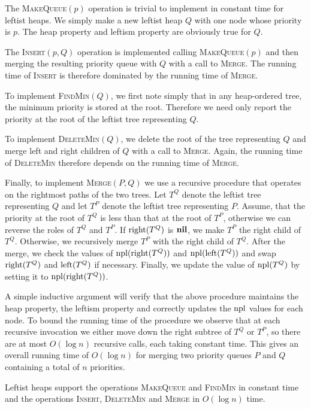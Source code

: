 The \textsc{MakeQueue}$(p)$ operation is trivial to implement in
constant time for leftist heaps.  We simply make a new leftist heap
$Q$ with one node whose priority is $p$.  The heap property and
leftism property are obviously true for $Q$.

The \textsc{Insert}$(p,Q)$ operation is implemented calling
\textsc{MakeQueue$(p)$} and then merging the resulting priority queue
with $Q$ with a call to \textsc{Merge}.  The running time of
\textsc{Insert} is therefore dominated by the running time of
\textsc{Merge}.

To implement \textsc{FindMin}$(Q)$, we first note simply that in
any heap-ordered tree, the minimum priority is stored at the
root. Therefore we need only report the priority at the root of the
leftist tree representing $Q$.

To implement \textsc{DeleteMin$(Q)$}, we delete the root of the tree
representing $Q$ and merge left and right children of $Q$ with a call
to \textsc{Merge}. Again, the running time of \textsc{DeleteMin}
therefore depends on the running time of \textsc{Merge}.

Finally, to implement \textsc{Merge$(P,Q)$} we use a recursive
procedure that operates on the rightmost paths of the two trees.  Let
$T^Q$ denote the leftist tree representing $Q$ and let $T^P$ denote
the leftist tree representing $P$.  Assume, that the priority at the
root of $T^Q$ is less than that at the root of $T^P$, otherwise we can
reverse the roles of $T^Q$ and $T^P$.  If $\mathrm{right}(T^Q)$ is $\mathbf{nil}$, we
make $T^P$ the right child of $T^Q$.  Otherwise, we recursively merge
$T^P$ with the right child of $T^Q$.  After the merge, we check the
values of $\mathrm{npl}(\mathrm{right}(T^Q))$ and $\mathrm{npl}(\mathrm{left}(T^Q))$ and swap
$\mathrm{right}(T^Q)$ and $\mathrm{left}(T^Q)$ if necessary.  Finally, we update the
value of $\mathrm{npl}(T^Q)$ by setting it to $\mathrm{npl}(\mathrm{right}(T^Q))$.

A simple inductive argument will verify that the above procedure
maintains the heap property, the leftism property and correctly
updates the $\mathrm{npl}$ values for each node.  To bound the running time of
the procedure we observe that at each recursive invocation we either
move down the right subtree of $T^Q$ or $T^P$, so there are at most
$O(\log n)$ recursive calls, each taking constant time.  This gives an
overall running time of $O(\log n)$ for merging two priority queues
$P$ and $Q$ containing a total of $n$ priorities.

\begin{thm}
Leftist heaps support the operations \textsc{MakeQueue} and
\textsc{FindMin} in constant time and the operations
\textsc{Insert}, \textsc{DeleteMin} and \textsc{Merge} in $O(\log n)$
time.
\end{thm}

